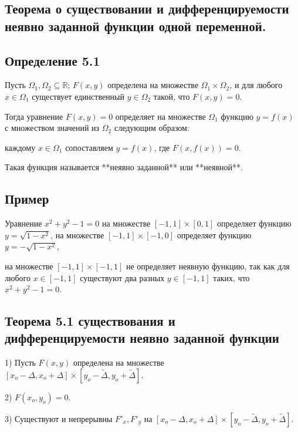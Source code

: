 {
\subsection{Теорема о существовании и дифференцируемости неявно заданной функции одной переменной.}

\subsection*{Определение 5.1}

Пусть \( \Omega_1, \Omega_2 \subseteq \mathbb{R} \); \( F(x,y) \) определена на множестве \( \Omega_1 \times \Omega_2 \), и для любого \( x \in \Omega_1 \) существует единственный \( y \in \Omega_2 \) такой, что \( F(x,y)=0 \).

Тогда уравнение \( F(x,y)=0 \) определяет на множестве \( \Omega_1 \) функцию \( y=f(x) \) с множеством значений из \( \Omega_2 \) следующим образом:

каждому \( x \in \Omega_1 \) сопоставляем \( y=f(x) \), где \( F(x, f(x))=0 \).

Такая функция называется **неявно заданной** или **неявной**.

\subsection*{Пример}

Уравнение \( x^2 + y^2 - 1 = 0 \) на множестве \( [-1, 1] \times [0, 1] \) определяет функцию \( y = \sqrt{1 - x^2} \), на множестве \( [-1, 1] \times [-1, 0] \) определяет функцию \( y = -\sqrt{1 - x^2} \),

на множестве \( [-1, 1] \times [-1, 1] \) не определяет неявную функцию, так как для любого \( x \in [-1, 1] \) существуют два разных \( y \in [-1, 1] \) таких, что \( x^2 + y^2 - 1 = 0 \).

\subsection*{Теорема 5.1 существования и дифференцируемости неявно заданной функции}

1) Пусть \( F(x,y) \) определена на множестве \( [x_o - \Delta, x_o + \Delta] \times [y_o - \tilde{\Delta}, y_o + \tilde{\Delta}] \).

2) \( F(x_o, y_o) = 0 \).

3) Существуют и непрерывны \( F'_x, F'_y \) на \( [x_o - \Delta, x_o + \Delta] \times [y_o - \tilde{\Delta}, y_o + \tilde{\Delta}] \).

}
